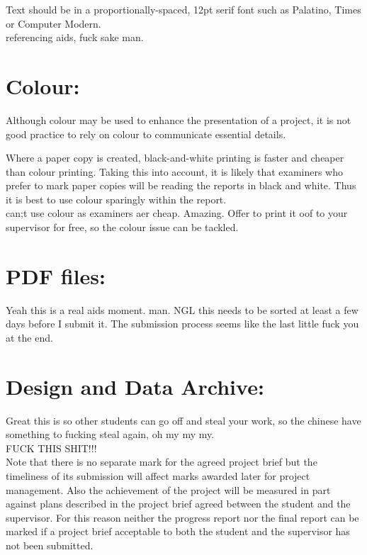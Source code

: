 \documentclass [12pt]{article}
\begin{document}
Text should be in a proportionally-spaced, 12pt serif font such as Palatino, Times or Computer Modern. \\


referencing aids, fuck sake man.\\ 

\section{Colour:}

Although colour may be used to enhance the presentation of a project, it is not good practice to rely on colour to communicate essential details.

Where a paper copy is created, black-and-white printing is faster and cheaper than colour printing. Taking this into account, it is likely that examiners who prefer to mark paper copies will be reading the reports in black and white. Thus it is best to use colour sparingly within the report. \\

can;t use colour as examiners aer cheap. Amazing. Offer to print it oof to your supervisor for free, so the colour issue can be tackled.\\ 

\section{PDF files:}

Yeah this is a real aids moment. man. NGL this needs to be sorted at least a few days before I submit it. The submission process seems like the last little fuck you at the end.\\

\section{Design and Data Archive:}

Great this is so other students can go off and steal your work, so the chinese have something to fucking steal again, oh my my my.\\ FUCK THIS SHIT!!!\\


Note that there is no separate mark for the agreed project brief but the timeliness of its submission will affect marks awarded later for project management. Also the achievement of the project will be measured in part against plans described in the project brief agreed between the student and the supervisor. For this reason neither the progress report nor the final report can be marked if a project brief acceptable to both the student and the supervisor has not been submitted. \\
\end{document}
